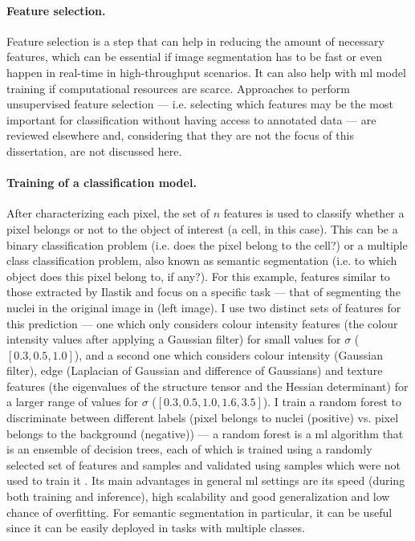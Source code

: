 \paragraph{Feature selection.} Feature selection is a step that can help in reducing the amount of necessary features, which can be essential if image segmentation has to be fast or even happen in real-time in high-throughput scenarios. It can also help with \ac{ml} model training if computational resources are scarce. Approaches to perform unsupervised feature selection --- i.e. selecting which features may be the most important for classification without having access to annotated data --- are reviewed elsewhere \cite{Solorio-Fernandez2020-cx} and, considering that they are not the focus of this dissertation, are not discussed here. 
	
\paragraph{Training of a classification model.} After characterizing each pixel, the set of $n$ features is used to classify whether a pixel belongs or not to the object of interest (a cell, in this case). This can be a binary classification problem (i.e. does the pixel belong to the cell?) or a multiple class classification problem, also known as semantic segmentation (i.e. to which object does this pixel belong to, if any?). For this example, features similar to those extracted by Ilastik \cite{Sommer2011-ds} and focus on a specific task --- that of segmenting the nuclei in the original image in  (left image). I use two distinct sets of features for this prediction --- one which only considers colour intensity features (the colour intensity values after applying a Gaussian filter) for small values for $\sigma$ ($[0.3,0.5,1.0]$), and a second one which considers colour intensity (Gaussian filter), edge (Laplacian of Gaussian and difference of Gaussians) and texture features (the eigenvalues of the structure tensor and the Hessian determinant) for a larger range of values for $\sigma$ ($[0.3,0.5,1.0,1.6,3.5]$). I train a random forest to discriminate between different labels (pixel belongs to nuclei (positive) vs. pixel belongs to the background (negative)) --- a random forest is a \ac{ml} algorithm that is an ensemble of decision trees, each of which is trained using a randomly selected set of features and samples and validated using samples which were not used to train it \cite{Breiman2001-yz}. Its main advantages in general \ac{ml} settings are its speed (during both training and inference), high scalability and good generalization and low chance of overfitting. For semantic segmentation in particular, it can be useful since it can be easily deployed in tasks with multiple classes.

